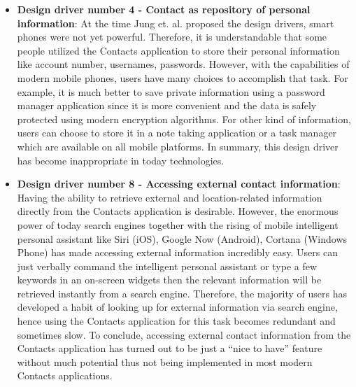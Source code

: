 \begin{itemize}
  \item \textbf{Design driver number 4 - Contact as repository of personal information}: At the time Jung et. al. proposed the design drivers, smart phones were not yet powerful. Therefore, it is understandable that some people utilized the Contacts application to store their personal information like account number, usernames, passwords. However, with the capabilities of modern mobile phones, users have many choices to accomplish that task. For example, it is much better to save private information using a password manager application since it is more convenient and the data is safely protected using modern encryption algorithms. For other kind of information, users can choose to store it in a note taking application or a task manager which are available on all mobile platforms. In summary, this design driver has become inappropriate in today technologies.
  \item \textbf{Design driver number 8 - Accessing external contact information}: Having the ability to retrieve external and location-related information directly from the Contacts application is desirable. However, the enormous power of today search engines together with the rising of mobile intelligent personal assistant like Siri (iOS), Google Now (Android), Cortana (Windows Phone) has made accessing external information incredibly easy. Users can just verbally command the intelligent personal assistant or type a few keywords in an on-screen widgets then the relevant information will be retrieved instantly from a search engine. Therefore, the majority of users has developed a habit of looking up for external information via search engine, hence using the Contacts application for this task becomes redundant and sometimes slow. To conclude, accessing external contact information from the Contacts application has turned out to be just a ``nice to have'' feature without much potential thus not being implemented in most modern Contacts applications. 

\end{itemize}
